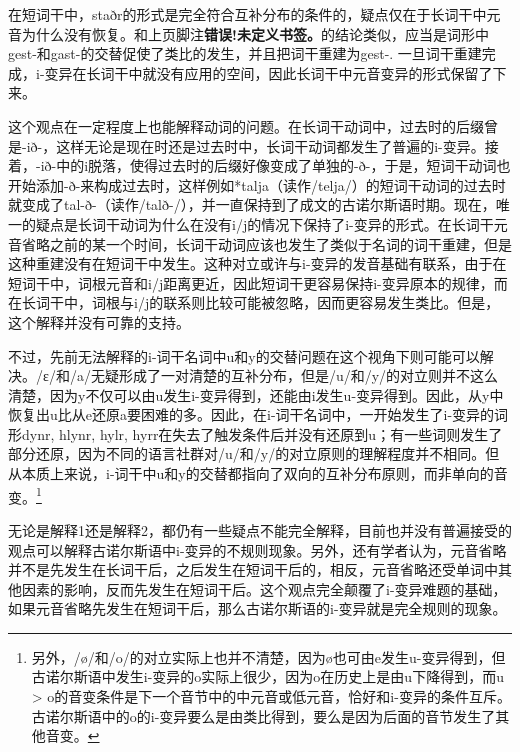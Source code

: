 在短词干中，staðr的形式是完全符合互补分布的条件的，疑点仅在于长词干中元音为什么没有恢复。和上页脚注\textbf{错误!未定义书签。}的结论类似，应当是词形中gest-和gast-的交替促使了类比的发生，并且把词干重建为gest-.
一旦词干重建完成，i-变异在长词干中就没有应用的空间，因此长词干中元音变异的形式保留了下来。

这个观点在一定程度上也能解释动词的问题。在长词干动词中，过去时的后缀曾是-ið-，这样无论是现在时还是过去时中，长词干动词都发生了普遍的i-变异。接着，-ið-中的i脱落，使得过去时的后缀好像变成了单独的-ð-，于是，短词干动词也开始添加-ð-来构成过去时，这样例如*talja（读作/telja/）的短词干动词的过去时就变成了tal-ð-（读作/talð-/），并一直保持到了成文的古诺尔斯语时期。现在，唯一的疑点是长词干动词为什么在没有i/j的情况下保持了i-变异的形式。在长词干元音省略之前的某一个时间，长词干动词应该也发生了类似于名词的词干重建，但是这种重建没有在短词干中发生。这种对立或许与i-变异的发音基础有联系，由于在短词干中，词根元音和i/j距离更近，因此短词干更容易保持i-变异原本的规律，而在长词干中，词根与i/j的联系则比较可能被忽略，因而更容易发生类比。但是，这个解释并没有可靠的支持。

不过，先前无法解释的i-词干名词中u和y的交替问题在这个视角下则可能可以解决。/ɛ/和/a/无疑形成了一对清楚的互补分布，但是/u/和/y/的对立则并不这么清楚，因为y不仅可以由u发生i-变异得到，还能由i发生u-变异得到。因此，从y中恢复出u比从e还原a要困难的多。因此，在i-词干名词中，一开始发生了i-变异的词形dynr,
hlynr, hylr,
hyrr在失去了触发条件后并没有还原到u；有一些词则发生了部分还原，因为不同的语言社群对/u/和/y/的对立原则的理解程度并不相同。但从本质上来说，i-词干中u和y的交替都指向了双向的互补分布原则，而非单向的音变。\footnote{另外，/ø/和/o/的对立实际上也并不清楚，因为ø也可由e发生u-变异得到，但古诺尔斯语中发生i-变异的o实际上很少，因为o在历史上是由u下降得到，而u
  \textgreater{}
  o的音变条件是下一个音节中的中元音或低元音，恰好和i-变异的条件互斥。古诺尔斯语中的o的i-变异要么是由类比得到，要么是因为后面的音节发生了其他音变。}

无论是解释1还是解释2，都仍有一些疑点不能完全解释，目前也并没有普遍接受的观点可以解释古诺尔斯语中i-变异的不规则现象。另外，还有学者认为，元音省略并不是先发生在长词干后，之后发生在短词干后的，相反，元音省略还受单词中其他因素的影响，反而先发生在短词干后。这个观点完全颠覆了i-变异难题的基础，如果元音省略先发生在短词干后，那么古诺尔斯语的i-变异就是完全规则的现象。
